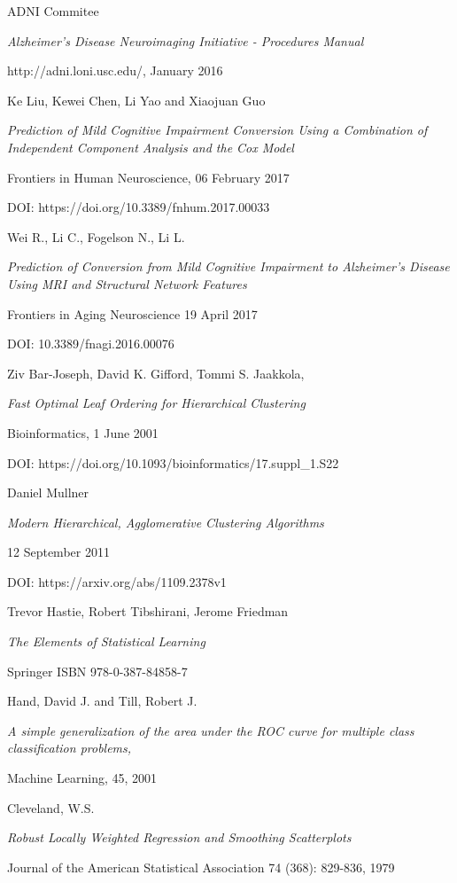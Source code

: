 \documentclass[12pt,openright,twoside,a4paper]{book}
\begin{document}
\begin{thebibliography}{99}
ADNI Commitee

\emph{Alzheimer's Disease Neuroimaging Initiative - Procedures Manual}

http://adni.loni.usc.edu/, January 2016


Ke Liu, Kewei Chen, Li Yao and Xiaojuan Guo

\emph{Prediction of Mild Cognitive Impairment Conversion Using a Combination of Independent Component Analysis and the Cox Model}

Frontiers in Human Neuroscience, 06 February 2017

DOI:  https://doi.org/10.3389/fnhum.2017.00033

Wei R., Li C., Fogelson N., Li L.

\emph{Prediction of Conversion from Mild Cognitive Impairment to Alzheimer's Disease Using MRI and Structural Network Features}

Frontiers in Aging Neuroscience  19 April 2017

DOI: 10.3389/fnagi.2016.00076

Ziv Bar-Joseph, David K. Gifford, Tommi S. Jaakkola, 

\emph{Fast Optimal Leaf Ordering for Hierarchical Clustering}

 Bioinformatics, 1 June 2001
 
 DOI: https://doi.org/10.1093/bioinformatics/17.suppl\_1.S22
 
 Daniel Mullner
 
\emph{Modern Hierarchical, Agglomerative Clustering Algorithms} 

12 September 2011

DOI: https://arxiv.org/abs/1109.2378v1

Trevor Hastie, Robert Tibshirani, Jerome Friedman

\emph{The Elements of Statistical Learning}

Springer ISBN 978-0-387-84858-7

Hand, David J. and Till, Robert J.

\emph{A simple generalization of the area under the ROC curve for multiple class classification problems,}

Machine Learning, 45, 2001

Cleveland, W.S. 

\emph{Robust Locally Weighted Regression and Smoothing Scatterplots}

Journal of the American Statistical Association 74 (368): 829-836, 1979



 \end{thebibliography}
 
 
\end{document}
